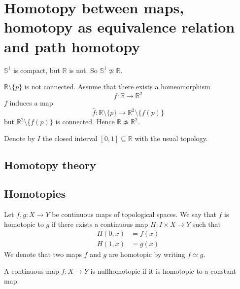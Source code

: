 \section{Homotopy between maps, homotopy as equivalence relation and path homotopy}

\begin{example}
    \( \mathbb{S}^1 \) is compact, but \( \mathbb{R} \) is not.
    So \( \mathbb{S}^1 \not\simeq \mathbb{R} \).
\end{example}

\begin{example}
    \( \mathbb{R} \setminus \{ p \}  \) is not connected.
    Assume that there exists a homeomorphism
    \[
      f: \mathbb{R} \to \mathbb{R}^2
    \]
    \( f \) induces a map
    \[
      \hat{f}: \mathbb{R} \setminus \{ p \}  \to \mathbb{R}^2 \setminus \{ f(p) \} 
    \]
    but \( \mathbb{R}^2 \setminus \{ f(p) \}  \) is connected.
    Hence \( \mathbb{R} \not\simeq \mathbb{R}^2 \).
\end{example}

Denote by \( I \) the closed interval \( [0, 1] \subseteq \mathbb{R} \)
with the usual topology.

\subsection{Homotopy theory}

\subsection{Homotopies}

\begin{definition}[Homotopy]
    Let \( f,g: X \to Y \) be continuous maps
    of topological spaces.
    We say that \( f \) is homotopic to \( g \)
    if there exists a continuous map
    \( H: I \times X \to Y \) such that
    \begin{align}
      H(0, x) &= f(x) \\
      H(1, x) &= g(x)
    \end{align}
    We denote that two maps \( f \) and \( g \) are homotopic
    by writing \( f \simeq g \).
\end{definition}

\begin{definition}[Nullhomotopy]
   A continuous map \( f: X \to Y \)
   is nullhomotopic if it is homotopic
   to a constant map.
\end{definition}

